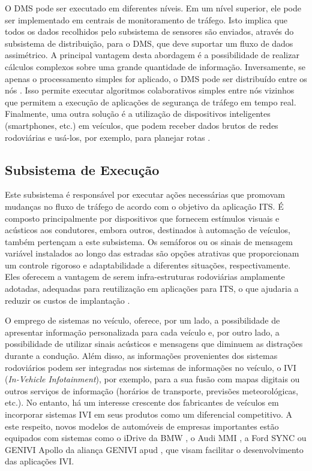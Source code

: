 \documentclass[
	12pt,				%
	oneside,			%
	a4paper,			%
	english,			%
	brazil				%
	]{abntex2ppgsi}
\begin{document}
O DMS pode ser executado em diferentes níveis. Em um nível superior, ele pode ser implementado em centrais de monitoramento de tráfego. Isto implica que todos os dados recolhidos pelo subsistema de sensores são enviados, através do subsistema de distribuição, para o DMS, que deve suportar um fluxo de dados assimétrico. A principal vantagem desta abordagem é a possibilidade de realizar cálculos complexos sobre uma grande quantidade de informação. Inversamente, se apenas o processamento simples for aplicado, o DMS pode ser distribuído entre os nós . Isso permite executar algoritmos colaborativos simples entre nós vizinhos que permitem a execução de aplicações de segurança de tráfego em tempo real. Finalmente, uma outra solução é a utilização de dispositivos inteligentes (smartphones, etc.) em veículos, que podem receber dados brutos de redes rodoviárias e usá-los, por exemplo, para planejar rotas \cite{losilla2011comprehensive}.

\subsection{Subsistema de Execução}

Este subsistema é responsável por executar ações necessárias que promovam mudanças no fluxo de tráfego de acordo com o objetivo da aplicação ITS. É composto principalmente por dispositivos que fornecem estímulos visuais e acústicos aos condutores, embora outros, destinados à automação de veículos, também pertençam a este subsistema. Os semáforos ou os sinais de mensagem variável instalados ao longo das estradas são opções atrativas que proporcionam um controle rigoroso e adaptabilidade a diferentes situações, respectivamente. Eles oferecem a vantagem de serem infra-estruturas rodoviárias amplamente adotadas, adequadas para reutilização em aplicações para ITS, o que ajudaria a reduzir os custos de implantação \cite{losilla2011comprehensive}. 

O emprego de sistemas no veículo, oferece, por um lado, a possibilidade de apresentar informação personalizada para cada veículo e, por outro lado, a possibilidade de utilizar sinais acústicos e mensagens que diminuem as distrações durante a condução. Além disso, as informações provenientes dos sistemas rodoviários podem ser integradas nos sistemas de informações no veículo, o IVI (\textit{In-Vehicle Infotainment}), por exemplo, para a sua fusão com mapas digitais ou outros serviços de informação (horários de transporte, previsões meteorológicas, etc.). No entanto, há um interesse crescente dos fabricantes de veículos em incorporar sistemas IVI em seus produtos como um diferencial competitivo. A este respeito, novos modelos de automóveis de empresas importantes estão equipados com sistemas como o iDrive da BMW \cite{niedermaier2009new}, o Audi MMI , a Ford SYNC  ou GENIVI Apollo da aliança GENIVI apud  , que visam facilitar o desenvolvimento das aplicações IVI.
\end{document}
